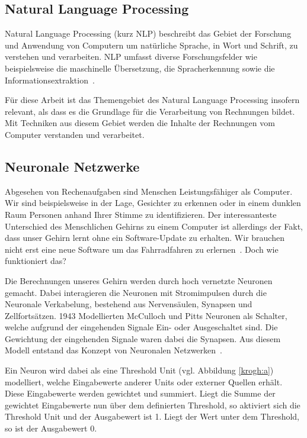 \subsection{Natural Language Processing}

Natural Language Processing (kurz NLP) beschreibt das Gebiet der Forschung und Anwendung von Computern um natürliche Sprache, in Wort und Schrift, zu verstehen und verarbeiten. NLP umfasst diverse Forschungsfelder wie beispielsweise die maschinelle Übersetzung, die Spracherkennung sowie die Informationsextraktion~\autocite{Chowdhury2003}. 

Für diese Arbeit ist das Themengebiet des Natural Language Processing insofern relevant, als dass es die Grundlage für die Verarbeitung von Rechnungen bildet. Mit Techniken aus diesem Gebiet werden die Inhalte der Rechnungen vom Computer verstanden und verarbeitet.

\subsection{Neuronale Netzwerke}
\label{chap:neuron}

Abgesehen von Rechenaufgaben sind Menschen Leistungsfähiger als Computer. Wir sind beispielsweise in der Lage, Gesichter zu erkennen oder in einem dunklen Raum Personen anhand Ihrer Stimme zu identifizieren. Der interessanteste Unterschied des Menschlichen Gehirns zu einem Computer ist allerdings der Fakt, dass unser Gehirn lernt ohne ein Software-Update zu erhalten. Wir brauchen nicht erst eine neue Software um das Fahrradfahren zu erlernen~\autocite{Krogh2008}. Doch wie funktioniert das?

Die Berechnungen unseres Gehirn werden durch hoch vernetzte Neuronen gemacht. Dabei interagieren die Neuronen mit Stromimpulsen durch die Neuronale Verkabelung, bestehend aus Nervensäulen, Synapsen und Zellfortsätzen. 1943 Modellierten McCulloch und Pitts Neuronen als Schalter, welche aufgrund der eingehenden Signale Ein- oder Ausgeschaltet sind. Die Gewichtung der eingehenden Signale waren dabei die Synapsen. Aus diesem Modell entstand das Konzept von Neuronalen Netzwerken~\autocite{Krogh2008}.

Ein Neuron wird dabei als eine Threshold Unit (vgl. Abbildung \ref{krogh:a}) modelliert, welche Eingabewerte anderer Units oder externer Quellen erhält. Diese Eingabewerte werden gewichtet und summiert. Liegt die Summe der gewichtet Eingabewerte nun über dem definierten Threshold, so aktiviert sich die Threshold Unit und der Ausgabewert ist 1. Liegt der Wert unter dem Threshold, so ist der Ausgabewert 0.

